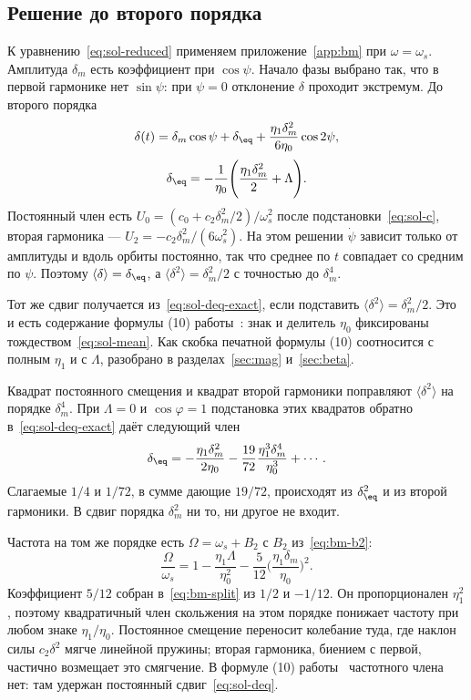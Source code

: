 \subsection{Решение до второго порядка}
\label{sec:sol-bm}

К уравнению~\eqref{eq:sol-reduced} применяем приложение~\ref{app:bm} при $\omega=\omega_s$. Амплитуда $\delta_m$ есть коэффициент при $\cos\psi$. Начало фазы выбрано так, что в первой гармонике нет $\sin\psi$: при $\psi=0$ отклонение $\delta$ проходит экстремум. До второго порядка
\begin{equation}
\label{eq:sol-delta}
\delta(t)
=\delta_m\cos\psi
+\delta_\eq
+\frac{\eta_1\delta_m^2}{6\eta_0}\cos 2\psi,
\end{equation}
\begin{equation}
\label{eq:sol-deq}
\delta_\eq
=-\frac{1}{\eta_0}
\Biggl(
\frac{\eta_1\delta_m^2}{2}
+\Lambda
\Biggr).
\end{equation}
Постоянный член есть $U_0=(c_0+c_2\delta_m^2/2)/\omega_s^2$ после подстановки~\eqref{eq:sol-c}, вторая гармоника --- $U_2=-c_2\delta_m^2/(6\omega_s^2)$. На этом решении $\dot\psi$ зависит только от амплитуды и вдоль орбиты постоянно, так что среднее по $t$ совпадает со средним по $\psi$. Поэтому $\langle\delta\rangle=\delta_\eq$, а $\langle\delta^2\rangle=\delta_m^2/2$ с точностью до $\delta_m^4$.

Тот же сдвиг получается из~\eqref{eq:sol-deq-exact}, если подставить $\langle\delta^2\rangle=\delta_m^2/2$. Это и есть содержание формулы (10) работы~\cite{Senichev2013}: знак и делитель $\eta_0$ фиксированы тождеством~\eqref{eq:sol-mean}. Как скобка печатной формулы (10) соотносится с полным $\eta_1$ и с $\Lambda$, разобрано в разделах~\ref{sec:mag} и~\ref{sec:beta}.

Квадрат постоянного смещения и квадрат второй гармоники поправляют $\langle\delta^2\rangle$ на порядке $\delta_m^4$. При $\Lambda=0$ и $\cos\varphi=1$ подстановка этих квадратов обратно в~\eqref{eq:sol-deq-exact} даёт следующий член
\begin{equation}
\label{eq:sol-a4}
\delta_\eq
=-\frac{\eta_1\delta_m^2}{2\eta_0}
-\frac{19}{72}\frac{\eta_1^3\delta_m^4}{\eta_0^3}
+\cdots.
\end{equation}
Слагаемые $1/4$ и $1/72$, в сумме дающие $19/72$, происходят из $\delta_\eq^2$ и из второй гармоники. В сдвиг порядка $\delta_m^2$ ни то, ни другое не входит.

Частота на том же порядке есть $\Omega=\omega_s+B_2$ с $B_2$ из~\eqref{eq:bm-b2}:
\begin{equation}
\label{eq:sol-omega}
\frac{\Omega}{\omega_s}
=1
-\frac{\eta_1\Lambda}{\eta_0^2}
-\frac{5}{12}
\Biggl(\frac{\eta_1\delta_m}{\eta_0}\Biggr)^2.
\end{equation}
Коэффициент $5/12$ собран в~\eqref{eq:bm-split} из $1/2$ и $-1/12$. Он пропорционален $\eta_1^2$, поэтому квадратичный член скольжения на этом порядке понижает частоту при любом знаке $\eta_1/\eta_0$. Постоянное смещение переносит колебание туда, где наклон силы $c_2\delta^2$ мягче линейной пружины; вторая гармоника, биением с первой, частично возмещает это смягчение. В формуле (10) работы~\cite{Senichev2013} частотного члена нет: там удержан постоянный сдвиг~\eqref{eq:sol-deq}.

